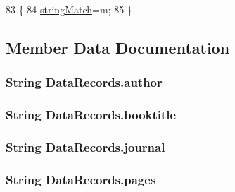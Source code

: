 \begin{DoxyCode}
83     \{
84         \hyperlink{classDataRecords_a45d9849a7089e7461c8e5568ee0cac20}{stringMatch}=m;
85     \}
\end{DoxyCode}


\subsection{Member Data Documentation}
\subsubsection[{\texorpdfstring{author}{author}}]{\setlength{\rightskip}{0pt plus 5cm}String Data\+Records.\+author\hspace{0.3cm}{\ttfamily [private]}}\hypertarget{classDataRecords_a16230e6e4a7ff8947225b5336f34b727}{}\label{classDataRecords_a16230e6e4a7ff8947225b5336f34b727}
\subsubsection[{\texorpdfstring{booktitle}{booktitle}}]{\setlength{\rightskip}{0pt plus 5cm}String Data\+Records.\+booktitle\hspace{0.3cm}{\ttfamily [private]}}\hypertarget{classDataRecords_ad43b933314b398e13701deb18add0d49}{}\label{classDataRecords_ad43b933314b398e13701deb18add0d49}
\subsubsection[{\texorpdfstring{journal}{journal}}]{\setlength{\rightskip}{0pt plus 5cm}String Data\+Records.\+journal\hspace{0.3cm}{\ttfamily [private]}}\hypertarget{classDataRecords_a89f32013b5ffe93fe421f7ad37534086}{}\label{classDataRecords_a89f32013b5ffe93fe421f7ad37534086}
\subsubsection[{\texorpdfstring{pages}{pages}}]{\setlength{\rightskip}{0pt plus 5cm}String Data\+Records.\+pages\hspace{0.3cm}{\ttfamily [private]}}\hypertarget{classDataRecords_ad4ecb52d88a34679b11d9473acfca9f7}{}\label{classDataRecords_ad4ecb52d88a34679b11d9473acfca9f7}

